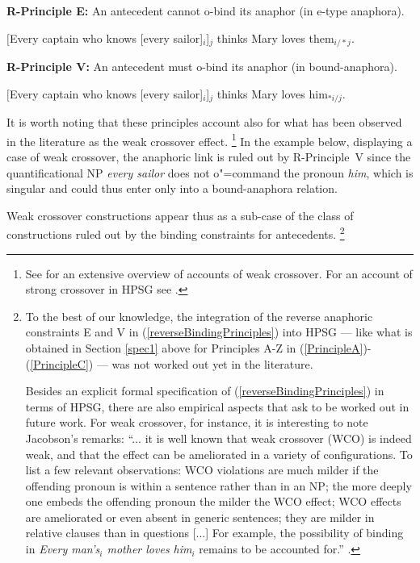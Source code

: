 \documentclass[output=paper
,modfonts
,nonflat]{langsci/langscibook}
\begin{document}

\begin{exe}
\ex\label{reverseBindingPrinciples}
{\textbf{R-Principle E:}} An antecedent cannot o-bind its anaphor (in \mbox{e-type} anaphora).

\sn
{$[$Every captain who knows [every sailor]$_{i}$]$_{j}$ thinks Mary loves them$_{i/*j}$.}
\end{exe}


\begin{exe}
\sn
{\textbf{R-Principle V:}} An antecedent must o-bind its anaphor (in bound-anaphora).

\sn
{$[$Every captain who knows [every sailor]$_{i}$]$_{j}$ thinks Mary loves him$_{*i/j}$.}
\end{exe}





It is worth noting that these principles account also for what has been observed in the literature 
as the weak crossover effect.%
\footnote{See \citep[Section~2.1]{jacobson:paycheck2000} for an extensive overview of 
accounts of weak crossover. For an account of strong crossover in HPSG see
\citep[]{polsag:hpsg94}. }
% 
In the example below, displaying a case
of weak crossover, the anaphoric link is ruled out
by \mbox{R-Principle V} since the quantificational NP {\em every sailor} does not
o"=command the pronoun {\em him}, which is singular and could thus enter
only into a bound-anaphora relation. 

\begin{exe}
\end{exe}

Weak crossover constructions
appear thus as a sub-case of the class of constructions ruled out
by the binding constraints for antecedents.%
\footnote{
To the best of our knowledge, the integration of the reverse anaphoric constraints 
E and V in (\ref{reverseBindingPrinciples}) into HPSG ---
like what is obtained in Section \ref{spec1} above for Principles A-Z in (\ref{PrincipleA})-(\ref{PrincipleC}) ---
was not worked out yet in the literature.

Besides an explicit formal specification of (\ref{reverseBindingPrinciples}) in terms of HPSG, 
there are also empirical aspects
that ask to be worked out in future work. 
For weak crossover, for instance, it is interesting to note Jacobson's remarks: ``... it is well known
that weak crossover (WCO) is indeed weak, and that the effect can be
ameliorated in a variety of configurations. To list a few relevant
observations: WCO violations are much milder if the offending
pronoun is within a sentence rather than in an NP; the more deeply
one embeds the offending pronoun the milder the WCO effect;
WCO effects are ameliorated or even absent in generic sentences;
they are milder in relative clauses than in questions [...] For example,
the possibility of binding in {\em Every man's$_{i}$ mother loves him$_{i}$}
remains to be accounted for.'' \citep[]{jacobson:paycheck2000}.
}
%
\end{document}
